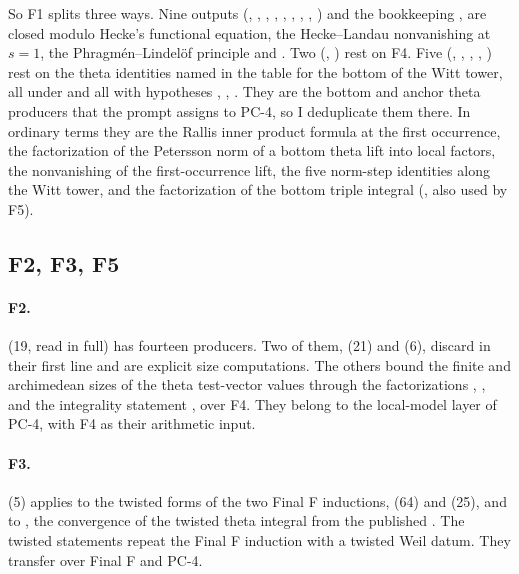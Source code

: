 \documentclass[11pt]{article}
\newcommand{\PC}[1]{\textsf{PC-#1}}
\theoremstyle{remark}
\begin{document}
So F1 splits three ways. Nine outputs (, , , , , , , , ) and the bookkeeping ,  are closed modulo Hecke's functional equation, the Hecke--Landau nonvanishing at $s=1$, the Phragm\'en--Lindel\"of principle and . Two (, ) rest on F4. Five (, , , , ) rest on the theta identities named in the table for the bottom of the Witt tower, all under  and all with hypotheses , , . They are the bottom and anchor theta producers that the prompt assigns to \PC{4}, so I deduplicate them there. In ordinary terms they are the Rallis inner product formula at the first occurrence, the factorization of the Petersson norm of a bottom theta lift into local factors, the nonvanishing of the first-occurrence lift, the five norm-step identities along the Witt tower, and the factorization of the bottom triple integral (, also used by F5).

\subsection{F2, F3, F5}\label{sec:fu2f235}

\paragraph{F2.}  (19, read in full) has fourteen producers. Two of them,  (21) and  (6), discard  in their first line and are explicit size computations. The others bound the finite and archimedean sizes of the theta test-vector values through the factorizations , ,  and the integrality statement , over F4. They belong to the local-model layer of \PC{4}, with F4 as their arithmetic input.

\paragraph{F3.}  (5) applies  to the twisted forms of the two Final F inductions,  (64) and  (25), and to , the convergence of the twisted theta integral from the published . The twisted statements repeat the Final F induction with a twisted Weil datum. They transfer over Final F and \PC{4}.
\end{document}
